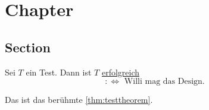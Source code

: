 
\chapter{Chapter}
\section{Section}

\begin{satz}[Testtheorem]\label{thm:testtheorem}
	Sei $T$ ein Test. Dann ist $T$ \underline{erfolgreich} 
	\[
	:\iff \text{ Willi mag das Design}
	.\] 
\end{satz}

Das ist das berühmte \ref{thm:testtheorem}.


